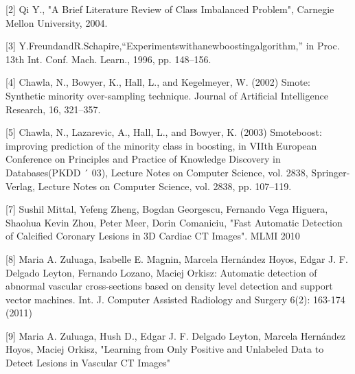 [2] Qi Y., "A Brief Literature Review of Class Imbalanced Problem", Carnegie Mellon University, 2004.

[3] Y.FreundandR.Schapire,“Experimentswithanewboostingalgorithm,” in Proc. 13th Int. Conf. Mach. Learn., 1996, pp. 148–156.

[4] Chawla, N., Bowyer, K., Hall, L., and Kegelmeyer, W. (2002) Smote: Synthetic minority over-sampling technique. Journal of Artificial Intelligence Research, 16, 321–357.

[5] Chawla, N., Lazarevic, A., Hall, L., and Bowyer, K. (2003) Smoteboost: improving prediction of the minority class in boosting, in VIIth European Conference on Principles and Practice of Knowledge Discovery in Databases(PKDD ´ 03), Lecture Notes on Computer Science, vol. 2838, Springer-Verlag, Lecture Notes on Computer Science, vol. 2838, pp. 107–119.

[7] Sushil Mittal, Yefeng Zheng, Bogdan Georgescu, Fernando Vega Higuera, Shaohua Kevin Zhou, Peter Meer, Dorin Comaniciu, "Fast Automatic Detection of Calcified Coronary Lesions in 3D Cardiac CT Images". MLMI 2010

[8] Maria A. Zuluaga, Isabelle E. Magnin, Marcela Hernández Hoyos, Edgar J. F. Delgado Leyton, Fernando Lozano, Maciej Orkisz: Automatic detection of abnormal vascular cross-sections based on density level detection and support vector machines. Int. J. Computer Assisted Radiology and Surgery 6(2): 163-174 (2011)

[9] Maria A. Zuluaga, Hush D., Edgar J. F. Delgado Leyton, Marcela Hernández Hoyos, Maciej Orkisz, "Learning from Only Positive and Unlabeled Data to Detect Lesions in Vascular CT Images"

